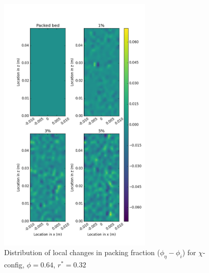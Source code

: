 \begin{figure}[!t]
    \centering
    \includegraphics[width = 0.65\textwidth]{figures/x-64-r23-1-deltas.png}
    \caption{Distribution of local changes in packing fraction ($\phi_{\eta} - \phi_i$) for $\chi$-config, $\phi = 0.64$, $r^* = 0.32$}\label{fig:x-64-r23-deltas}
\end{figure}

